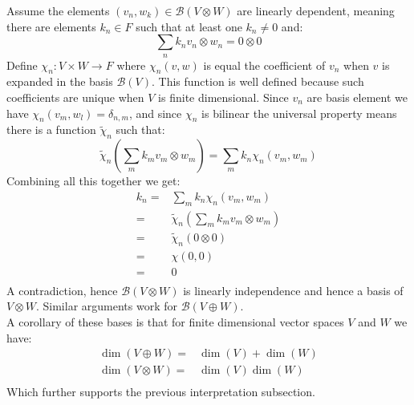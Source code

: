 Assume the elements $(v_n,w_k)\in\mathcal{B}(V\otimes W)$ are linearly dependent,
meaning there are elements $k_n\in F$ such that at least one $k_n\neq0$ and:
\[\sum_nk_nv_n\otimes w_n=0\otimes0\]
Define $\chi_n:V\times W\rightarrow F$ where $\chi_n(v,w)$ is equal the coefficient of $v_n$ when $v$ is expanded in the basis $\mathcal{B}(V)$.
This function is well defined because such coefficients are unique when $V$ is finite dimensional.
Since $v_n$ are basis element we have $\chi_n(v_m,w_l) = \delta_{n,m}$,
and since $\chi_n$ is bilinear the universal property means there is a function $\tilde{\chi}_n$ such that:
\[\tilde{\chi}_n\left(\sum_mk_mv_m\otimes w_m\right) = \sum_mk_n\chi_n(v_m,w_m)\]
Combining all this together we get:
\begin{equation*}
\begin{aligned}
	k_n =& \sum_mk_n\chi_n(v_m,w_m)\\
	=&\tilde{\chi}_n\left(\sum_mk_mv_m\otimes w_m\right)\\
	=&\tilde{\chi}_n(0\otimes 0)\\
	=&\chi(0,0)\\
	=&0\\
\end{aligned}
\end{equation*}
A contradiction,
hence $\mathcal{B}(V\otimes W)$ is linearly independence and hence a basis of $V\otimes W$.
Similar arguments work for $\mathcal{B}(V\oplus W)$.
\\

A corollary of these bases is that for finite dimensional vector spaces $V$ and $W$ we have:
\begin{equation*}
\begin{aligned}
	\dim(V\oplus W) =& \dim(V)+\dim(W)\\
	\dim(V\otimes W) =& \dim(V)\dim(W)\\
\end{aligned}
\end{equation*}
Which further supports the previous interpretation subsection.

